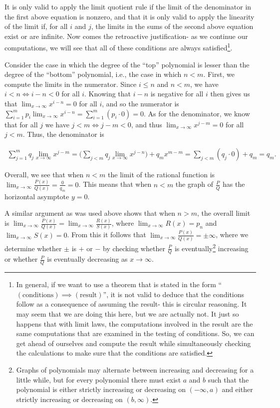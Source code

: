 \documentclass{article}
\begin{document}
It is only valid to apply the limit quotient rule if the limit of the denominator in the first above equation is nonzero, and that it is only valid to apply the linearity of the limit if, for all $i$ and $j$, the limits in the sums of the second above equation exist or are infinite. Now comes the retroactive justification- as we continue our computations, we will see that all of these conditions are always satisfied\footnote{In general, if we want to use a theorem that is stated in the form ``$(\text{conditions}) \implies (\text{result})$'', it is not valid to deduce that the conditions follow as a consequence of assuming the result- this is circular reasoning. It may seem that we are doing this here, but we are actually not. It just so happens that with limit laws, the computations involved in the result are the same computations that are examined in the testing of conditions. So, we can get ahead of ourselves and compute the result while simultaneously checking the calculations to make sure that the conditions are satisfied.}.

Consider the case in which the degree of the ``top'' polynomial is lesser than the degree of the ``bottom'' polynomial, i.e., the case in which $n < m$. First, we compute the limits in the numerator. Since $i \leq n$ and $n < m$, we have $i < n \iff i - n < 0$ for all $i$. Knowing that $i - n$ is negative for all $i$ then gives us that $\lim_{x \rightarrow \infty} x^{i - n} = 0$ for all $i$, and so the numerator is $\sum_{i = 1}^m p_i \lim_{x \rightarrow \infty} x^{i - n} = \sum_{i = 1}^m (p_i \cdot 0) = 0$. As for the denominator, we know that for all $j$ we have $j < m \iff j - m < 0$, and thus $\lim_{x \rightarrow \infty} x^{j - m} = 0$ for all $j < m$. Thus, the denominator is 

\begin{align*}
    \sum_{j = 1}^m q_j \lim_{x \rightarrow \infty} x^{j - m} = \Big( \sum_{j < m} q_j \lim_{x \rightarrow \infty} x^{j - n} \Big) + q_m x^{m - m} = \sum_{j < m} (q_j \cdot 0) + q_m = q_m.
\end{align*}

Overall, we see that when $n < m$ the limit of the rational function is $\lim_{x \rightarrow \infty} \frac{P(x)}{Q(x)} = \frac{0}{q_m} = 0$. This means that when $n < m$ the graph of $\frac{P}{Q}$ has the horizontal asymptote $y = 0$. 

A similar argument as was used above shows that when $n > m$, the overall limit is $\lim_{x \rightarrow \infty} \frac{P(x)}{Q(x)} = \lim_{x \rightarrow \infty} \frac{R(x)}{S(x)}$, where $\lim_{x \rightarrow \infty} R(x) = p_n$ and $\lim_{x \rightarrow \infty} S(x) = 0$. From this it follows that $\lim_{x \rightarrow \infty} \frac{P(x)}{Q(x)} = \pm \infty$, where we determine whether $\pm$ is $+$ or $-$ by checking whether $\frac{P}{Q}$ is eventually\footnote{Graphs of polynomials may alternate between increasing and decreasing for a little while, but for every polynomial there must exist $a$ and $b$ such that the polynomial is either strictly increasing or decreasing on $(-\infty, a)$ and either strictly increasing or decreasing on $(b, \infty)$.} increasing or whether $\frac{P}{Q}$ is eventually decreasing as $x \rightarrow \infty$.
\end{document}

